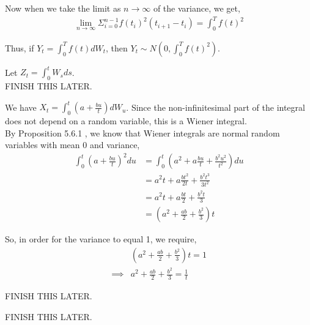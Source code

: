 \documentclass[12pt]{article}
\newenvironment{problem}[2][Problem]{\begin{trivlist}
\item[\hskip \labelsep {\bfseries #1}\hskip \labelsep {\bfseries #2.}]}{\end{trivlist}}
\begin{document}
Now when we take the limit as $n \to \infty$ of the variance, we get,
\begin{align*}
\lim_{n \to \infty} \Sigma_{i=0}^{n-1} f(t_i)^2(t_{i+1} - t_i) = \int_0^T f(t)^2
\end{align*}

Thus, if $Y_t = \int_0^T f(t) dW_t$, then $Y_t \sim N(0, \int_0^T f(t)^2)$.

\begin{problem}{15}
\end{problem}

Let $Z_t = \int_0^t W_s ds$.\\

FINISH THIS LATER.

\begin{problem}{16}
\end{problem}

We have $X_t = \int_0^t (a+\frac{bu}{t}) dW_u$. Since the non-infinitesimal part of the integral does not depend on a random variable, this is a Wiener integral.\\

By Proposition 5.6.1 , we know that Wiener integrals are normal random variables with mean 0 and variance,
\begin{align*}
\int_0^t (a+\frac{bu}{t})^2du &= \int_0^t (a^2 + a\frac{bu}{t} + \frac{b^2u^2}{t^2}) du\\
&= a^2t + a\frac{bt^2}{2t} + \frac{b^2t^3}{3t^2}\\
&= a^2t + a\frac{bt}{2} + \frac{b^2t}{3}\\
&= (a^2 + \frac{ab}{2} + \frac{b^2}{3})t
\end{align*}

So, in order for the variance to equal 1, we require,
\begin{align*}
&(a^2 + \frac{ab}{2} + \frac{b^2}{3})t = 1\\
\implies &a^2 + \frac{ab}{2} + \frac{b^2}{3} = \frac{1}{t}
\end{align*}

\begin{problem}{17}
\end{problem}

FINISH THIS LATER.

\begin{problem}{18}
\end{problem}

FINISH THIS LATER.

\begin{problem}{19}
\end{problem}
\end{document}
